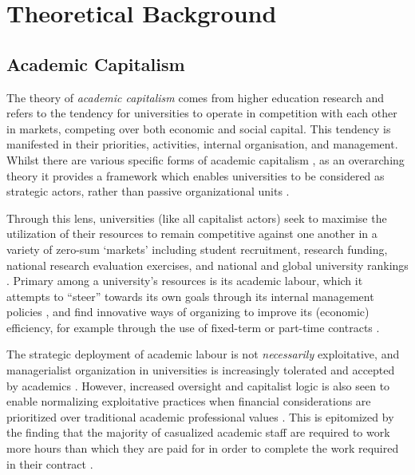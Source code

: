 \documentclass[ authordate, meta, issue]{jote-new-article}
\begin{document}
\section{Theoretical Background}



\subsection{Academic Capitalism}



The theory of \emph{academic capitalism} comes from higher education research and refers to the tendency for universities to operate in competition with each other in markets, competing over both economic and social capital. This tendency is manifested in their priorities, activities, internal organisation, and management. Whilst there are various specific forms of academic capitalism \parencites{Jessop2018}, as an overarching theory it provides a framework which enables universities to be considered as strategic actors, rather than passive organizational units \parencites{Münch2014}.



Through this lens, universities (like all capitalist actors) seek to maximise the utilization of their resources to remain competitive against one another in a variety of zero-sum ‘markets’ including student recruitment, research funding, national research evaluation exercises, and national and global university rankings \parencites{Collini2012}. Primary among a university’s resources is its academic labour, which it attempts to “steer” towards its own goals through its internal management policies \parencites{Rees2015}, and find innovative ways of organizing to improve its (economic) efficiency, for example through the use of fixed-term or part-time contracts \parencites{Macfarlane2011}.



The strategic deployment of academic labour is not \emph{necessarily} exploitative, and managerialist organization in universities is increasingly tolerated and accepted by academics \parencites{Kolsaker2008}. However, increased oversight and capitalist logic is also seen to enable normalizing exploitative practices when financial considerations are prioritized over traditional academic professional values \parencites{Vican2020}. This is epitomized by the finding that the majority of casualized academic staff are required to work more hours than which they are paid for in order to complete the work required in their contract \parencites[i.e., marking essays to a suitable academic standard;][]{University2019}.
\end{document}
